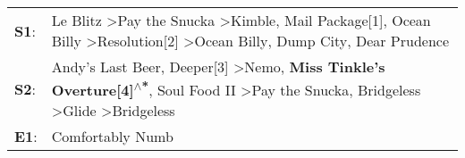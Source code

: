 \begin{supertabular}{p{0.03\textwidth}p{0.92\textwidth}}
 \textbf{S1}:  &                         Le Blitz\textsuperscript{} \textgreater \enspace Pay the Snucka\textsuperscript{} \textgreater \enspace Kimble\textsuperscript{}, \enspace Mail Package[1]\textsuperscript{}, \enspace Ocean Billy\textsuperscript{} \textgreater \enspace Resolution[2]\textsuperscript{} \textgreater \enspace Ocean Billy\textsuperscript{}, \enspace Dump City\textsuperscript{}, \enspace Dear Prudence\textsuperscript{}  \enspace  \\
 \textbf{S2}:  &  Andy's Last Beer\textsuperscript{}, \enspace Deeper[3]\textsuperscript{} \textgreater \enspace Nemo\textsuperscript{}, \enspace \textbf{Miss Tinkle's Overture[4]\textsuperscript{$\wedge$*}}, \enspace Soul Food II\textsuperscript{} \textgreater \enspace Pay the Snucka\textsuperscript{}, \enspace Bridgeless\textsuperscript{} \textgreater \enspace Glide\textsuperscript{} \textgreater \enspace Bridgeless\textsuperscript{}  \enspace  \\
 \textbf{E1}:  &                                                                                                                                                                                                                                                                                                                                                                                                     Comfortably Numb\textsuperscript{}  \enspace  \\
\end{supertabular}
